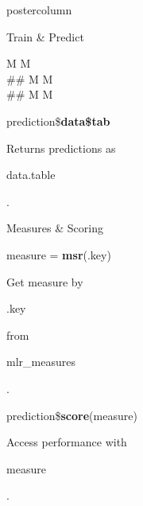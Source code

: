 \documentclass{beamer}
\newcommand{\codeinline}[1]{\begin{codeboxinline}#1\end{codeboxinline}}
\begin{document}
\begin{frame}[fragile]{}
\begin{columns}
\begin{column}{.245\textwidth}
\begin{beamercolorbox}[center]{postercolumn}
\begin{minipage}{.98\textwidth}
{\begin{myblock}{Train \& Predict}
\begin{codeboxmultiline}[width=23cm]
{							\space\space\space\space M \space\space\space\space\space\space\space M\\
							\#\# \space\space\space 200
							\space\space\space\space M \space\space\space\space\space\space\space M\\
							\#\# \space\space\space 207
							\space\space\space\space M \space\space\space\space\space\space\space M}
                        \end{codeboxmultiline}
						\vspace{1em}
						\begin{codebox}
							prediction\$\textbf{data\$tab}
						\end{codebox}
						Returns predictions as \codeinline{data.table}.
                       \end{myblock}
                       \begin{myblock}{Measures \& Scoring}
							\begin{codebox}
								measure = \textbf{msr}(.key)
							\end{codebox}
							Get measure by \codeinline{.key} from \codeinline{mlr\_measures}.
							\\
							\begin{codebox}
								prediction\$\textbf{score}(measure)
							\end{codebox}
							Access performance with \codeinline{measure}.
					\end{myblock}
					\vfill
					}
				\end{minipage}
			\end{beamercolorbox}
		\end{column}
	\end{columns}
\end{frame}
\end{document}
